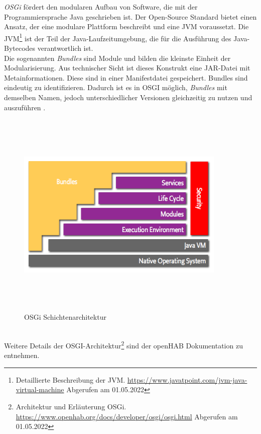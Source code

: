     \textit{OSGi} fördert den modularen Aufbau von Software, die mit der Programmiersprache Java geschrieben ist. Der Open-Source 
    Standard bietet einen Ansatz, der eine modulare Plattform beschreibt und eine \ac{JVM} voraussetzt. Die \acl{JVM}\footnote{Detaillierte Beschreibung der JVM. \url{https://www.javatpoint.com/jvm-java-virtual-machine} Abgerufen am 01.05.2022} 
    ist der Teil der Java-Laufzeitumgebung, die für die Ausführung des Java-Bytecodes verantwortlich ist.
    \\
    Die sogenannten \textit{Bundles} sind Module und bilden die kleinste Einheit der Modularisierung. Aus technischer Sicht ist 
    dieses Konstrukt eine \ac{JAR}-Datei mit Metainformationen. Diese sind in einer Manifestdatei gespeichert. Bundles sind 
    eindeutig zu identifizieren. Dadurch ist es in \acs{OSGI} möglich, \textit{Bundles} mit demselben Namen, jedoch unterschiedlicher 
    Versionen gleichzeitig zu nutzen und auszuführen \cite{openHAB-article}. 
    \begin{figure}[hbt!]
        \centering
        \includegraphics[width=10cm,height=10cm,keepaspectratio]{images/osgi-architecture.png}
        \caption{OSGi Schichtenarchitektur \cite{openhab-osgi}}
        \label{fig:osgilayer}
    \end{figure}
    \\
    \linebreak
    Weitere Details der \acs{OSGI}-Architektur\footnote{Architektur und Erläuterung OSGi. \url{https://www.openhab.org/docs/developer/osgi/osgi.html} Abgerufen am 01.05.2022} 
    sind der openHAB Dokumentation zu entnehmen.

